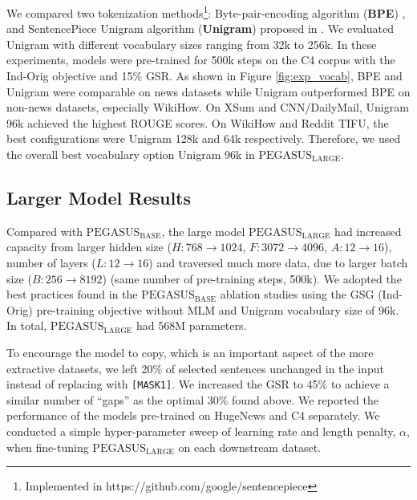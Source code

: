 \documentclass{article}
\newcommand\pegasusbase{$\text{PEGASUS}_{\text{BASE}}$\xspace}
\newcommand\pegasuslarge{$\text{PEGASUS}_{\text{LARGE}}$\xspace}
\newcommand\largemodelsize{568M\xspace}
\newcommand\gnews{HugeNews\xspace}
\begin{document}
We compared two tokenization methods\footnote{Implemented in https://github.com/google/sentencepiece}: Byte-pair-encoding algorithm (\textbf{BPE}) \citep{wu2016wordpiece,sennrich-etal-2016-neural}, and SentencePiece Unigram algorithm (\textbf{Unigram}) proposed in \citet{kudo2018sentencepiece}. We evaluated Unigram with different vocabulary sizes ranging from 32k to 256k. In these experiments, models were pre-trained for 500k steps on the C4 corpus with the Ind-Orig objective and 15\% GSR. As shown in Figure \ref{fig:exp_vocab}, BPE and Unigram were comparable on news datasets while Unigram outperformed BPE on non-news datasets, especially WikiHow. 
On XSum and CNN/DailyMail, Unigram 96k achieved the highest ROUGE scores. On WikiHow and Reddit TIFU, the best configurations were Unigram 128k and 64k respectively. 
Therefore, we used the overall best vocabulary option Unigram 96k in \pegasuslarge.





\subsection{Larger Model Results}
\label{sec:exp_large_model}

Compared with \pegasusbase, the large model \pegasuslarge had increased capacity from larger hidden size ($H:768\rightarrow1024$, $F:3072\rightarrow4096$, $A: 12\rightarrow 16$), number of layers ($L:12\rightarrow16$) and traversed much more data, due to larger batch size ($B: 256\rightarrow8192$) (same number of pre-training steps, 500k).
We adopted the best practices found in the \pegasusbase ablation studies using the GSG (Ind-Orig) pre-training objective without MLM and Unigram vocabulary size of 96k. In total, \pegasuslarge had \largemodelsize parameters. 

To encourage the model to copy, which is an important aspect of the more extractive datasets, we 
left 20\% of selected sentences unchanged in the input instead of replacing with \texttt{[MASK1]}.
 We increased the GSR to 45\% to achieve a similar number of ``gaps'' as the optimal 30\% found above. We reported the performance of the models pre-trained on \gnews and C4 separately. We conducted a simple hyper-parameter sweep of learning rate
 and length penalty, $\alpha$,  when fine-tuning \pegasuslarge on each downstream dataset.
\end{document}
